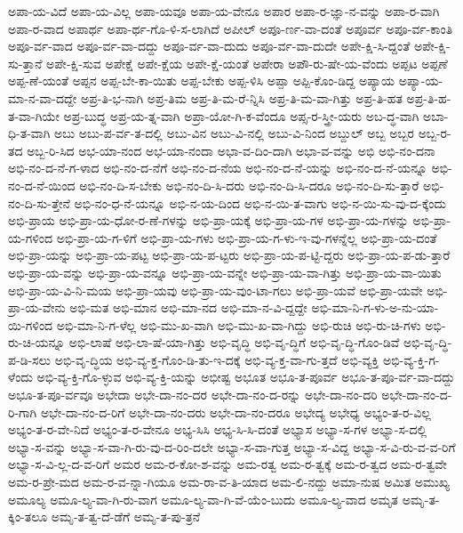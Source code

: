{ಅಪಾ-ಯ-ವಿದೆ
ಅಪಾ-ಯ-ವಿಲ್ಲ
ಅಪಾ-ಯವೂ
ಅಪಾ-ಯ-ವೇನೂ
ಅಪಾರ
ಅಪಾ-ರ-ಜ್ಞಾ-ನ-ವನ್ನು
ಅಪಾ-ರ-ವಾಗಿ
ಅಪಾ-ರ-ವಾದ
ಅಪಾರ್ಥ
ಅಪಾ-ರ್ಥ-ಗೊ-ಳಿ-ಸ-ಲಾಗಿದೆ
ಅಪೀಲ್
ಅಪೂ-ರ್ಣ-ವಾ-ದಂತೆ
ಅಪೂರ್ವ
ಅಪೂ-ರ್ವ-ಕಾಂತಿ
ಅಪೂ-ರ್ವ-ವಾದ
ಅಪೂ-ರ್ವ-ವಾ-ದದ್ದು
ಅಪೂ-ರ್ವ-ವಾ-ದುದು
ಅಪೂ-ರ್ವ-ವಾ-ದುದೇ
ಅಪೇ-ಕ್ಷಿ-ಸಿ-ದ್ದಂತೆ
ಅಪೇ-ಕ್ಷಿ-ಸು-ತ್ತಾನೆ
ಅಪೇ-ಕ್ಷಿ-ಸುವ
ಅಪೇಕ್ಷೆ
ಅಪೇ-ಕ್ಷೆಯ
ಅಪೇ-ಕ್ಷೆ-ಯಂತೆ
ಅಪೇರಾ
ಅಪೌ-ರು-ಷೇ-ಯ-ವೆಂದು
ಅಪ್ಪಟ
ಅಪ್ಪಣೆ
ಅಪ್ಪ-ಣೆ-ಯಂತೆ
ಅಪ್ಪನ
ಅಪ್ಪ-ಬೇ-ಕಾ-ಯಿತು
ಅಪ್ಪ-ಬೇಕು
ಅಪ್ಪ-ಳಿಸಿ
ಅಪ್ಪಾ
ಅಪ್ಪಿ-ಕೊಂ-ಡಿದ್ದ
ಅಪ್ಯಾಯ
ಅಪ್ಯಾ-ಯ-ಮಾ-ನ-ವಾ-ದದ್ದೇ
ಅಪ್ರ-ತಿ-ಭ-ನಾಗಿ
ಅಪ್ರ-ತಿಮ
ಅಪ್ರ-ತಿ-ಮ-ರೆ-ನ್ನಿಸಿ
ಅಪ್ರ-ತಿ-ಮ-ವಾ-ಗಿತ್ತು
ಅಪ್ರ-ತಿ-ಹತ
ಅಪ್ರ-ತಿ-ಹ-ತ-ವಾ-ಗಿಯೇ
ಅಪ್ರ-ಬುದ್ಧ
ಅಪ್ರ-ಯ-ತ್ನ-ವಾಗಿ
ಅಪ್ರಾ-ಯೋ-ಗಿ-ಕ-ವೆಂದೂ
ಅಪ್ಸ-ರ-ಸ್ತ್ರೀ-ಯರು
ಅಬ-ದ್ಧ-ವಾಗಿ
ಅಬಾ-ಧಿ-ತ-ವಾಗಿ
ಅಬು
ಅಬು-ಪ-ರ್ವ-ತ-ದಲ್ಲಿ
ಅಬು-ವಿನ
ಅಬು-ವಿ-ನಲ್ಲಿ
ಅಬು-ವಿ-ನಿಂದ
ಅಬ್ದುಲ್
ಅಬ್ಬ
ಅಬ್ಬರ
ಅಬ್ಬ-ರ-ತದ
ಅಬ್ಬ-ರಿ-ಸಿದ
ಅಭ-ಯಾ-ನಂದ
ಅಭ-ಯಾ-ನಂದಾ
ಅಭಾ-ವ-ದಿಂ-ದಾಗಿ
ಅಭಾ-ವ-ವನ್ನು
ಅಭಿ
ಅಭಿ-ನಂ-ದನಾ
ಅಭಿ-ನಂ-ದ-ನೆ-ಗ-ಳಾದ
ಅಭಿ-ನಂ-ದ-ನೆಗೆ
ಅಭಿ-ನಂ-ದ-ನೆಯ
ಅಭಿ-ನಂ-ದ-ನೆ-ಯನ್ನು
ಅಭಿ-ನಂ-ದ-ನೆ-ಯನ್ನೂ
ಅಭಿ-ನಂ-ದ-ನೆ-ಯಿಂದ
ಅಭಿ-ನಂ-ದಿ-ಸ-ಬೇಕು
ಅಭಿ-ನಂ-ದಿ-ಸಿ-ದರು
ಅಭಿ-ನಂ-ದಿ-ಸಿ-ದರೂ
ಅಭಿ-ನಂ-ದಿ-ಸು-ತ್ತಾರೆ
ಅಭಿ-ನಂ-ದಿ-ಸು-ತ್ತೇನೆ
ಅಭಿ-ನಂ-ಧ-ನೆ-ಯನ್ನೂ
ಅಭಿ-ನ-ಯ-ದಿಂದ
ಅಭಿ-ನ-ಯಿ-ತ-ವಾಗು
ಅಭಿ-ನ-ಯಿ-ಸು-ವು-ದ-ಕ್ಕೆಂದು
ಅಭಿ-ಪ್ರಾಯ
ಅಭಿ-ಪ್ರಾ-ಯ-ಧೋ-ರ-ಣೆ-ಗಳನ್ನು
ಅಭಿ-ಪ್ರಾ-ಯಕ್ಕೆ
ಅಭಿ-ಪ್ರಾ-ಯ-ಗಳ
ಅಭಿ-ಪ್ರಾ-ಯ-ಗಳನ್ನು
ಅಭಿ-ಪ್ರಾ-ಯ-ಗಳಿಂದ
ಅಭಿ-ಪ್ರಾ-ಯ-ಗ-ಳಿಗೆ
ಅಭಿ-ಪ್ರಾ-ಯ-ಗಳು
ಅಭಿ-ಪ್ರಾ-ಯ-ಗ-ಳು-ಇ-ವು-ಗಳನ್ನೆಲ್ಲ
ಅಭಿ-ಪ್ರಾ-ಯ-ದಂತೆ
ಅಭಿ-ಪ್ರಾ-ಯನ್ನು
ಅಭಿ-ಪ್ರಾ-ಯ-ಪಟ್ಟ
ಅಭಿ-ಪ್ರಾ-ಯ-ಪ-ಟ್ಟರು
ಅಭಿ-ಪ್ರಾ-ಯ-ಪ-ಟ್ಟಿ-ದ್ದರು
ಅಭಿ-ಪ್ರಾ-ಯ-ಪ-ಡು-ತ್ತಾರೆ
ಅಭಿ-ಪ್ರಾ-ಯ-ವನ್ನು
ಅಭಿ-ಪ್ರಾ-ಯ-ವನ್ನೂ
ಅಭಿ-ಪ್ರಾ-ಯ-ವನ್ನೇ
ಅಭಿ-ಪ್ರಾ-ಯ-ವಾ-ಗಿತ್ತು
ಅಭಿ-ಪ್ರಾ-ಯ-ವಾ-ಯಿತು
ಅಭಿ-ಪ್ರಾ-ಯ-ವಿ-ನಿ-ಮಯ
ಅಭಿ-ಪ್ರಾ-ಯವು
ಅಭಿ-ಪ್ರಾ-ಯ-ವುಂ-ಟಾ-ಗಲು
ಅಭಿ-ಪ್ರಾ-ಯವೆ
ಅಭಿ-ಪ್ರಾ-ಯವೇ
ಅಭಿ-ಪ್ರಾ-ಯ-ವೇನು
ಅಭಿ-ಮತ
ಅಭಿ-ಮಾನ
ಅಭಿ-ಮಾ-ನದ
ಅಭಿ-ಮಾ-ನ-ವಿ-ದ್ದದ್ದೇ
ಅಭಿ-ಮಾ-ನಿ-ಗ-ಳು-ಅ-ನು-ಯಾ-ಯಿ-ಗಳಿಂದ
ಅಭಿ-ಮಾ-ನಿ-ಗ-ಳೆಲ್ಲ
ಅಭಿ-ಮು-ಖ-ವಾಗಿ
ಅಭಿ-ಮು-ಖ-ವಾ-ಗಿದ್ದು
ಅಭಿ-ರುಚಿ
ಅಭಿ-ರು-ಚಿ-ಗಳು
ಅಭಿ-ರು-ಚಿ-ಯನ್ನೂ
ಅಭಿ-ಲಾಷೆ
ಅಭಿ-ಲಾ-ಷೆ-ಯಾ-ಗಿತ್ತು
ಅಭಿ-ವೃದ್ಧಿ
ಅಭಿ-ವೃ-ದ್ಧಿಗೆ
ಅಭಿ-ವೃ-ದ್ಧಿ-ಗೊಂ-ಡಿವೆ
ಅಭಿ-ವೃ-ದ್ಧಿ-ಪ-ಡಿ-ಸಲು
ಅಭಿ-ವೃ-ದ್ಧಿಯ
ಅಭಿ-ವ್ಯ-ಕ್ತ-ಗೊಂ-ಡಿ-ತು-ಇ-ದಕ್ಕೆ
ಅಭಿ-ವ್ಯ-ಕ್ತ-ವಾ-ಗು-ತ್ತದೆ
ಅಭಿ-ವ್ಯಕ್ತಿ
ಅಭಿ-ವ್ಯ-ಕ್ತಿ-ಗ-ಳೆಂದು
ಅಭಿ-ವ್ಯ-ಕ್ತಿ-ಗೊ-ಳ್ಳುವ
ಅಭಿ-ವ್ಯ-ಕ್ತಿ-ಯನ್ನು
ಅಭೀಷ್ಟ
ಅಭೂತ
ಅಭೂ-ತ-ಪೂರ್ವ
ಅಭೂ-ತ-ಪೂ-ರ್ವ-ವಾ-ದದ್ದು
ಅಭೂ-ತ-ಪೂ-ರ್ವವೂ
ಅಭೇದಾ
ಅಭೇ-ದಾ-ನಂ-ದರ
ಅಭೇ-ದಾ-ನಂ-ದ-ರನ್ನು
ಅಭೇ-ದಾ-ನಂ-ದರಿ
ಅಭೇ-ದಾ-ನಂ-ದ-ರಿ-ಗಾಗಿ
ಅಭೇ-ದಾ-ನಂ-ದ-ರಿಗೆ
ಅಭೇ-ದಾ-ನಂ-ದರು
ಅಭೇ-ದಾ-ನಂ-ದರೂ
ಅಭೇದ್ಯ
ಅಭೇಧ್ಯ
ಅಭ್ಯಂ-ತ-ರ-ವಿಲ್ಲ
ಅಭ್ಯಂ-ತ-ರ-ವೇ-ನಿದೆ
ಅಭ್ಯಂ-ತ-ರ-ವೇನೂ
ಅಭ್ಯ-ಸಿಸಿ
ಅಭ್ಯ-ಸಿ-ಸಿ-ದಂತೆ
ಅಭ್ಯಾಸ
ಅಭ್ಯಾ-ಸ-ಗಳ
ಅಭ್ಯಾ-ಸ-ದಲ್ಲಿ
ಅಭ್ಯಾ-ಸ-ವನ್ನು
ಅಭ್ಯಾ-ಸ-ವಾ-ಗಿ-ರು-ವು-ದ-ರಿಂ-ದಲೇ
ಅಭ್ಯಾ-ಸ-ವಾ-ಗುತ್ತ
ಅಭ್ಯಾ-ಸ-ವಿದ್ದ
ಅಭ್ಯಾ-ಸ-ವಿ-ರು-ವ-ವ-ರಿಗೆ
ಅಭ್ಯಾ-ಸ-ವಿ-ಲ್ಲ-ದ-ವ-ರಿಗೆ
ಅಮರ
ಅಮ-ರ-ಕೋ-ಶ-ವನ್ನು
ಅಮ-ರತ್ವ
ಅಮ-ರ-ತ್ವಕ್ಕೆ
ಅಮ-ರ-ತ್ವದ
ಅಮ-ರ-ತ್ವವೇ
ಅಮ-ರ-ಪ್ರೇ-ಮದ
ಅಮ-ರ-ವ-ನ್ನಾ-ಗಿಯೂ
ಅಮ-ರಾ-ವ-ತಿ-ಯಾದ
ಅಮ-ಲಿ-ನದ್ದು
ಅಮಾ-ನುಷ
ಅಮಿತ
ಅಮುಖ್ಯ
ಅಮೂಲ್ಯ
ಅಮೂ-ಲ್ಯ-ವಾ-ಗಿ-ರು-ವಾಗ
ಅಮೂ-ಲ್ಯ-ವಾ-ಗಿ-ವೆ-ಯೆಂ-ಬುದು
ಅಮೂ-ಲ್ಯ-ವಾದ
ಅಮೃತ
ಅಮೃ-ತ-ಕ್ಕಿಂ-ತಲೂ
ಅಮೃ-ತ-ತ್ವ-ದೆ-ಡೆಗೆ
ಅಮೃ-ತ-ಪು-ತ್ರನೆ
}
